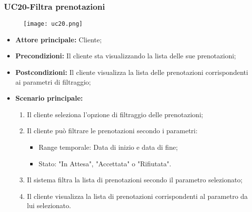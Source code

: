 \subsubsection{UC20-Filtra prenotazioni}
\begin{figure}[h] \texttt{[image: uc20.png]} \end{figure}
\begin{itemize}
\item \textbf{Attore principale:} Cliente;
\item \textbf{Precondizioni:} Il cliente sta visualizzando la lista delle sue prenotazioni;
\item \textbf{Postcondizioni:} Il cliente visualizza la lista delle prenotazioni corrispondenti ai parametri di filtraggio;
\item \textbf{Scenario principale:}
\begin{enumerate}
    \item Il cliente seleziona l'opzione di filtraggio delle prenotazioni;
    \item Il cliente può filtrare le prenotazioni secondo i parametri:
              \begin{itemize}
                \item Range temporale: Data di inizio e data di fine;
                \item Stato: "In Attesa", "Accettata" o "Rifiutata".
              \end{itemize}
    \item Il sistema filtra la lista di prenotazioni secondo il parametro selezionato;
    \item Il cliente visualizza la lista di prenotazioni corrispondenti al parametro da lui selezionato.
\end{enumerate}
\end{itemize}

